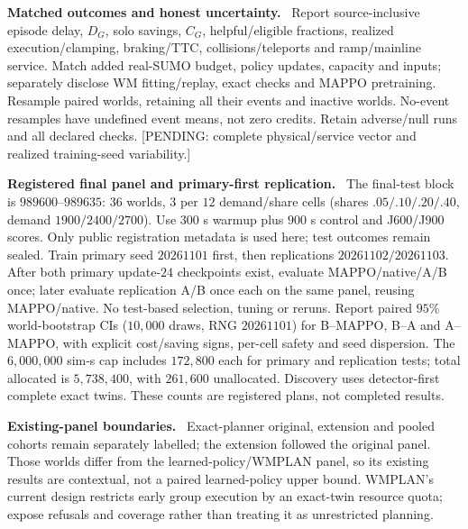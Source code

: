 \documentclass[conference]{IEEEtran}
\newcommand{\pending}[1]{\textcolor{red!80!black}{[PENDING: #1]}}
\newcommand{\para}[1]{\noindent\textbf{#1}\ }
\begin{document}
\para{Matched outcomes and honest uncertainty.}
Report source-inclusive episode delay, $D_G$, solo savings, $C_G$,
helpful/eligible fractions, realized execution/clamping, braking/TTC,
collisions/teleports and ramp/mainline service. Match added real-SUMO budget,
policy updates, capacity and inputs; separately disclose WM fitting/replay,
exact checks and MAPPO pretraining. Resample paired worlds, retaining all
their events and inactive worlds. No-event resamples have undefined event
means, not zero credits. Retain adverse/null runs and all declared checks.
\pending{complete physical/service vector and realized training-seed variability.}

\para{Registered final panel and primary-first replication.}
The final-test block is $989600$--$989635$: $36$ worlds, $3$ per $12$
demand/share cells (shares $.05/.10/.20/.40$, demand $1900/2400/2700$).
Use $300$ s warmup plus $900$ s control and J600/J900 scores.
Only public registration metadata is used here; test outcomes remain sealed.
Train primary seed $20261101$ first, then replications $20261102/20261103$.
After both primary update-$24$ checkpoints exist, evaluate MAPPO/native/A/B
once; later evaluate replication A/B once each on the same panel, reusing
MAPPO/native. No test-based selection, tuning or reruns.
Report paired $95\%$ world-bootstrap CIs ($10{,}000$ draws, RNG $20261101$)
for B--MAPPO, B--A and A--MAPPO, with explicit cost/saving signs, per-cell
safety and seed dispersion. The $6{,}000{,}000$ sim-s cap includes
$172{,}800$ each for primary and replication tests; total allocated is
$5{,}738{,}400$, with $261{,}600$ unallocated. Discovery uses detector-first
complete exact twins. These counts are registered plans, not completed results.

\para{Existing-panel boundaries.}
Exact-planner original, extension and pooled cohorts remain separately
labelled; the extension followed the original panel. Those worlds differ
from the learned-policy/WMPLAN panel, so its existing results are contextual,
not a paired learned-policy upper bound. WMPLAN's current design restricts
early group execution by an exact-twin resource quota; expose refusals and
coverage rather than treating it as unrestricted planning.
\end{document}
